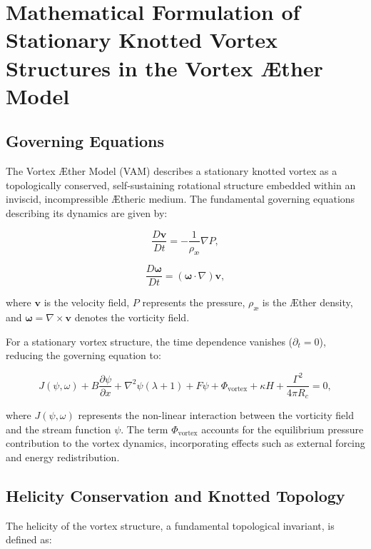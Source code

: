 
\section{Mathematical Formulation of Stationary Knotted Vortex Structures in the Vortex \AE ther Model}

\subsection{Governing Equations}
The Vortex \AE ther Model (VAM) describes a stationary knotted vortex as a topologically conserved, self-sustaining rotational structure embedded within an inviscid, incompressible \AE theric medium. The fundamental governing equations describing its dynamics are given by:

\begin{equation*}
\frac{D \mathbf{v}}{Dt} = -\frac{1}{\rho_{\text{\ae}}} \nabla P,
\end{equation*}

\begin{equation*}
\frac{D \boldsymbol{\omega}}{Dt} = (\boldsymbol{\omega} \cdot \nabla) \mathbf{v},
\end{equation*}

where $\mathbf{v}$ is the velocity field, $P$ represents the pressure, $\rho_{\text{\ae}}$ is the \AE ther density, and $\boldsymbol{\omega} = \nabla \times \mathbf{v}$ denotes the vorticity field.

For a stationary vortex structure, the time dependence vanishes ($\partial_t = 0$), reducing the governing equation to:

\begin{equation*}
J(\psi, \omega) + B \frac{\partial \psi}{\partial x} + \nabla^2 \psi (\lambda + 1) + F \psi + \Phi_{\text{vortex}} + \kappa H + \frac{\Gamma^2}{4 \pi R_c} = 0,
\end{equation*}

where $J(\psi, \omega)$ represents the non-linear interaction between the vorticity field and the stream function $\psi$. The term $\Phi_{\text{vortex}}$ accounts for the equilibrium pressure contribution to the vortex dynamics, incorporating effects such as external forcing and energy redistribution.

\subsection{Helicity Conservation and Knotted Topology}
The helicity of the vortex structure, a fundamental topological invariant, is defined as:

